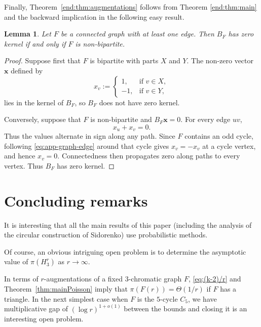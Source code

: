 \documentclass[12pt,a4paper]{article}
\numberwithin{equation}{section}
\newtheorem{lemma}[theorem]{Lemma}
\theoremstyle{definition}
\theoremstyle{remark}
\newcommand{\V}[1]{\boldsymbol{#1}}
\begin{document}
Finally,  Theorem~\ref{end:thm:augmentations}
follows from Theorem \ref{end:thm:main} and the backward implication in the following easy result.




\begin{lemma}\label{lem:app-graph-rank}
Let $F$ be a connected graph with at least one edge.  Then $B_F$ has zero kernel if and only if $F$ is non-bipartite.
\end{lemma}

\begin{proof}
Suppose first that $F$ is bipartite with parts $X$ and $Y$.  The non-zero vector $\V{x}$ defined by
\[
 x_v:=\left\{\begin{array}{rl}
 	 1,&\text{if $v\in X$},\\
-1,&\text{if $v\in Y$,}
\end{array}\right.
\]
lies in the kernel of $B_F$, so $B_F$ does not have zero kernel.

Conversely, suppose that $F$ is non-bipartite and $B_F\V{x}=0$.  For every edge $uv$,
\begin{equation}\label{eq:app-graph-edge}
 x_u+x_v=0.
\end{equation}
Thus the values alternate in sign along any path.  Since $F$ contains an odd cycle, following \eqref{eq:app-graph-edge} around that cycle gives $x_v=-x_v$ at a cycle vertex, and hence $x_v=0$.  Connectedness then propagates zero along paths to every vertex.  Thus $B_F$ has zero kernel.
\end{proof}

\section{Concluding remarks}
\label{sec:concluding}


It is interesting that all the main results of this paper (including the analysis of the circular construction of Sidorenko) use probabilistic methods.

Of course, an obvious intriguing open problem is to determine the asymptotic value of $\pi(H_3^r)$ as $r\to\infty$.

In terms of $r$-augmentations of a fixed $3$-chromatic graph $F$, \eqref{eq:(k-2)/r} and Theorem~\ref{thm:mainPoisson} imply that $\pi(F(r))=\Theta(1/r)$ if $F$ has a triangle. In the next simplest case when $F$ is the $5$-cycle $C_5$, we have multiplicative gap of $(\log r)^{1+o(1)}$ between the bounds and closing it is an interesting open problem.
\end{document}

